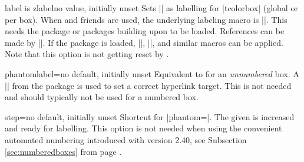 \begin{docTcbKey}[][doc new=2023-02-08]{label is zlabel}{}{no value, initially unset}
Sets |\zlabel| as labelling for |tcolorbox| (global or per box).
When  and friends are used, the underlying labeling macro is |\zlabel|.
This needs the  package \cite{oberdiek:zref} or packages building upon  to be loaded.
References can be made by |\zref|. If the  package \cite{barros:zref-clever} is loaded,
|\zcref|, |\zcpageref|, and similar macros can be applied.
Note that this option is not getting reset by .
\end{docTcbKey}




\begin{docTcbKey}[][doc new=2014-11-28]{phantomlabel}{=}{no default, initially unset}
Equivalent to  for an \emph{unnumbered} box.
A || from the package  \cite{rahtz:hyperref} is used to set a correct
hyperlink target.
This is not needed and should typically not be used for a numbered box.
\end{docTcbKey}

\clearpage

\begin{docTcbKey}{step}{=}{no default, initially unset}
Shortcut for |phantom={}|. The given  is
increased and ready for labelling. This option is not needed when
using the convenient automated numbering introduced with version 2.40,
see Subsection \ref{sec:numberedboxes}
from page \pageref{sec:numberedboxes}.
\end{docTcbKey}

